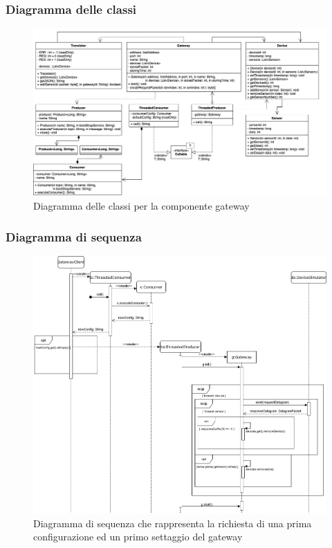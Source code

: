 	\begin{landscape}
		\subsubsection{Diagramma delle classi}%
		  	\begin{figure}[H]
				\centering
				\includegraphics[scale=0.499]{res/images/GATEWAY/ClassiGateway.png}
				\caption{Diagramma delle classi per la componente gateway}
				\label{Diagramma 2}
			\end{figure}	
	\end{landscape}
		
	\begin{landscape}
		\subsubsection{Diagramma di sequenza}%
		  	\begin{figure}[H]
				\centering
				\includegraphics[scale=0.450]{res/images/GATEWAY/RichiestaInvioGateway.png}
				\caption{Diagramma di sequenza che rappresenta la richiesta di una prima configurazione ed un primo settaggio del gateway}
				\label{Diagramma 3}
			\end{figure}
	\end{landscape}
	
